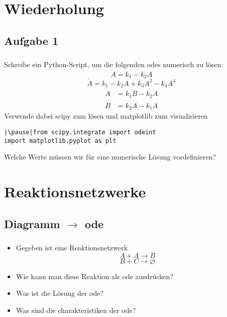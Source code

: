\section{Wiederholung}
\label{sec:recap}

\subsection{Aufgabe 1}
\begin{frame}[fragile]
    \frametitle{\insertsubsection}
    Schreibe ein Python-Script, um die folgenden \acp{ode} numerisch zu lösen:
    \begin{equation}
        \dot{A} = k_1 - k_2 A
    \end{equation}
    \begin{equation}
        \dot{A} = k_1 - k_2 A + k_3 A^2 - k_4 A^4
    \end{equation}
    \begin{align}
        \dot{A} &= k_1 B - k_2 A\\
        \dot{B} &= k_2 A - k_1 A
    \end{align}
    Verwende dabei scipy zum lösen und matplotlib zum visualisieren
    \begin{verbatim}
|\pause|from scipy.integrate import odeint
import matplotlib.pyplot as plt
    \end{verbatim}
    Welche Werte müssen wir für eine numerische Lösung vordefinieren?
\end{frame}


\section{Reaktionsnetzwerke}
\label{sec:reaction-networks}


\subsection{Diagramm $\rightarrow$ \acs{ode}}
\label{subsec:diag_to_eq}
\begin{frame}
    \frametitle{\insertsubsection}
    \begin{itemize}[<+->]
        \item Gegeben ist eine Reaktionsnetzwerk
        \[A + A \rightarrow B\]
        \[B + C \rightarrow \varnothing\]
        \item Wie kann man diese Reaktion als \ac{ode} ausdrücken?
        \item Was ist die Lösung der \ac{ode}?
        \item Was sind die charakteristiken der \ac{ode}?
    \end{itemize}
\end{frame}


